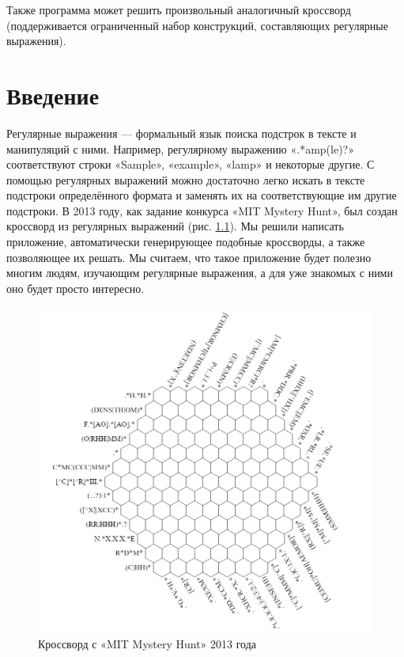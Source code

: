 \documentclass[12pt]{report}
\begin{document}
    Также программа может решить произвольный аналогичный кроссворд (поддерживается ограниченный набор конструкций, составляющих регулярные выражения).

    
    \newpage %
\renewcommand*\contentsname{Кроссворды из регулярных выражений }
\tableofcontents
    \newpage %
\chapter{Введение}
Регулярные выражения — формальный язык поиска подстрок в тексте и манипуляций с ними. Например, регулярному выражению «.*amp(le)?» соответствуют строки «Sample», «example», «lamp» и некоторые другие. С помощью регулярных выражений можно достаточно легко искать в тексте подстроки определённого формата и заменять их на соответствующие им другие подстроки. В 2013 году, как задание конкурса «MIT Mystery Hunt», был создан кроссворд из регулярных выражений (рис. \ref{pic:MITHex}). Мы решили написать приложение, автоматически генерирующее подобные кроссворды, а также позволяющее их решать. Мы считаем, что такое приложение будет полезно многим людям, изучающим регулярные выражения, а для уже знакомых с ними оно будет просто интересно.
 \begin{figure}[ht!]
 \centering
    \includegraphics[width=.7\textwidth]{MITHexagon.png}
    \caption{\label{pic:MITHex}Кроссворд с «MIT Mystery Hunt» 2013 года}
\end{figure}
\end{document}
